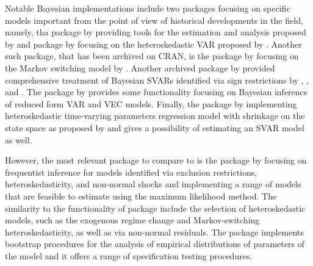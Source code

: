 \documentclass[
  nojss]{jss}
\begin{document}
Notable Bayesian implementations include two packages focusing on
specific models important from the point of view of historical
developments in the field, namely, tha package  by \cite{BVAR}
providing tools for the estimation and analysis proposed by
\cite{Giannone2015} and package  by \cite{bvarsv} focusing
on the heteroskedastic VAR proposed by \cite{Primiceri2005}. Another
such package, that has been archived on CRAN, is the package
 by \cite{MSBVAR} focusing on the Markov switching model by
\cite{Sims2006}. Another archived package  by
\cite{VARsignR} provided comprehensive treatment of Bayesian SVARs
identified via sign restrictions by \cite{uhlig2005effects},
\cite{rubio2010structural}, and \cite{fry2011sign}. The package
 by \cite{bvartools} provides some functionality focusing
on Bayesian inference of reduced form VAR and VEC models. Finally, the
package  by \cite{shrinkTVP} implementing heteroskedastic
time-varying parameters regression model with shrinkage on the state
space as proposed by \cite{Bitto2019} and \cite{Cadonna2020} gives a
possibility of estimating an SVAR model as well.

However, the most relevant package to compare to  is the
package  by \cite{svars} focusing on frequentist inference
for models identified via exclusion restrictions, heteroskedasticity,
and non-normal shocks and implementing a range of models that are
feasible to estimate using the maximum likelihood method. The similarity
to the functionality of package  include the selection of
heteroskedastic models, such as the exogenous regime change and
Markov-switching heteroskedasticity, as well as via non-normal
residuals. The package  implements bootstrap procedures for
the analysis of empirical distributions of parameters of the model and
it offers a range of specification testing procedures.
\end{document}
